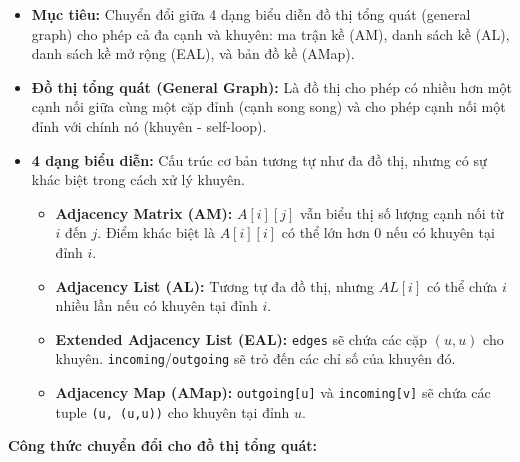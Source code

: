 \documentclass{article}
\begin{document}
\begin{itemize}
    \item \textbf{Mục tiêu:} Chuyển đổi giữa 4 dạng biểu diễn đồ thị tổng quát (general graph) cho phép cả đa cạnh và khuyên: ma trận kề (AM), danh sách kề (AL), danh sách kề mở rộng (EAL), và bản đồ kề (AMap).
    \item \textbf{Đồ thị tổng quát (General Graph):} Là đồ thị cho phép có nhiều hơn một cạnh nối giữa cùng một cặp đỉnh (cạnh song song) và cho phép cạnh nối một đỉnh với chính nó (khuyên - self-loop).
    \item \textbf{4 dạng biểu diễn:} Cấu trúc cơ bản tương tự như đa đồ thị, nhưng có sự khác biệt trong cách xử lý khuyên.
    \begin{itemize}
        \item \textbf{Adjacency Matrix (AM):} $A[i][j]$ vẫn biểu thị số lượng cạnh nối từ $i$ đến $j$. Điểm khác biệt là $A[i][i]$ có thể lớn hơn 0 nếu có khuyên tại đỉnh $i$.
        \item \textbf{Adjacency List (AL):} Tương tự đa đồ thị, nhưng $AL[i]$ có thể chứa $i$ nhiều lần nếu có khuyên tại đỉnh $i$.
        \item \textbf{Extended Adjacency List (EAL):} \texttt{edges} sẽ chứa các cặp $(u,u)$ cho khuyên. \texttt{incoming}/\texttt{outgoing} sẽ trỏ đến các chỉ số của khuyên đó.
        \item \textbf{Adjacency Map (AMap):} \texttt{outgoing[u]} và \texttt{incoming[v]} sẽ chứa các tuple \texttt{(u, (u,u))} cho khuyên tại đỉnh $u$.
    \end{itemize}
\end{itemize}

\textbf{Công thức chuyển đổi cho đồ thị tổng quát:}
\end{document}
